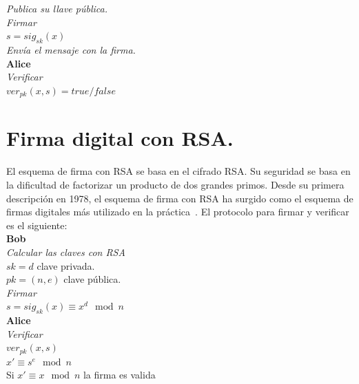 \textit{Publica su llave pública.} \\
\textit{Firmar} \\

\textit{$ s = sig_{sk} (x) $}\\

\textit{Envía el mensaje con la firma.} \\

\textbf{Alice}\\
\textit{Verificar} \\

\textit{$ ver_{pk} (x,s) = true/false $}  ~\cite{paar}\\ 



\section{Firma digital con RSA. }

El esquema de firma con RSA se basa en el cifrado RSA. Su seguridad se basa en la dificultad de factorizar un producto de dos grandes primos. Desde su primera descripción en 1978, el esquema de firma con RSA ha surgido como el esquema de firmas digitales más utilizado en la práctica~\cite{paar}. El protocolo para firmar y verificar es el siguiente: \\

\textbf{Bob}\\
\textit{Calcular las claves con RSA} \\

\textit{$ sk = d $} clave privada.\\

\textit{$ pk = (n, e) $} clave pública. \\
\textit{Firmar} \\

\textit{$ s = sig_{sk} (x) \equiv x^{d} \mod n $}\\

\textbf{Alice}\\
\textit{Verificar} \\

\textit{$ ver_{pk} (x,s) $}\\ 

\textit{$ x ' \equiv s^{e} \mod n$}\\ 

Si \textit{$ x ' \equiv x \mod n$} la firma es valida\\ 

